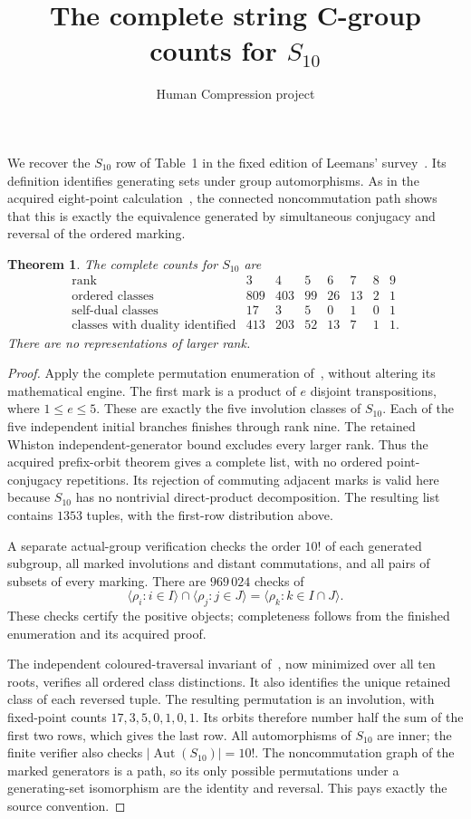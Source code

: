 \documentclass[10pt,a4paper]{article}
\title{The complete string C-group counts for $S_{10}$}
\author{Human Compression project}\date{}
\newtheorem{theorem}{Theorem}
\begin{document}
\maketitle
We recover the $S_{10}$ row of Table~1 in the fixed edition of
Leemans' survey~\cite{survey}.  Its definition identifies generating
sets under group automorphisms.  As in the acquired eight-point
calculation~\cite{eight}, the connected noncommutation path shows
that this is exactly the equivalence generated by simultaneous
conjugacy and reversal of the ordered marking.

\begin{theorem}
The complete counts for $S_{10}$ are
\[
\begin{array}{c|rrrrrrr}
\text{rank}&3&4&5&6&7&8&9\\\hline
\text{ordered classes}&809&403&99&26&13&2&1\\
\text{self-dual classes}&17&3&5&0&1&0&1\\
\text{classes with duality identified}&413&203&52&13&7&1&1.
\end{array}
\]
There are no representations of larger rank.
\end{theorem}
\begin{proof}
Apply the complete permutation enumeration of~\cite{method}, without
altering its mathematical engine.  The first mark is a product of
$e$ disjoint transpositions, where $1\le e\le5$.  These are exactly
the five involution classes of $S_{10}$.  Each of the five independent
initial branches finishes through rank nine.  The retained Whiston
independent-generator bound excludes every larger rank.  Thus the
acquired prefix-orbit theorem gives a complete list, with no ordered
point-conjugacy repetitions.  Its rejection of commuting adjacent
marks is valid here because $S_{10}$ has no nontrivial direct-product
decomposition.  The resulting list contains $1353$ tuples, with
the first-row distribution above.

A separate actual-group verification checks the order $10!$ of each
generated subgroup, all marked involutions and distant commutations,
and all pairs of subsets of every marking.  There are $969\,024$
checks of
\[
 \langle\rho_i:i\in I\rangle\cap\langle\rho_j:j\in J\rangle
 =\langle\rho_k:k\in I\cap J\rangle.
\]
These checks certify the positive objects; completeness follows from
the finished enumeration and its acquired proof.

The independent coloured-traversal invariant of~\cite{eight}, now
minimized over all ten roots, verifies all ordered class distinctions.
It also identifies the unique retained class of each reversed tuple.
The resulting permutation is an involution, with fixed-point counts
$17,3,5,0,1,0,1$.  Its orbits therefore number half the sum of the
first two rows, which gives the last row.  All automorphisms of
$S_{10}$ are inner; the finite verifier also checks
$|\operatorname{Aut}(S_{10})|=10!$.  The noncommutation graph of
the marked generators is a path, so its only possible permutations
under a generating-set isomorphism are the identity and reversal.
This pays exactly the source convention.
\end{proof}
\end{document}
